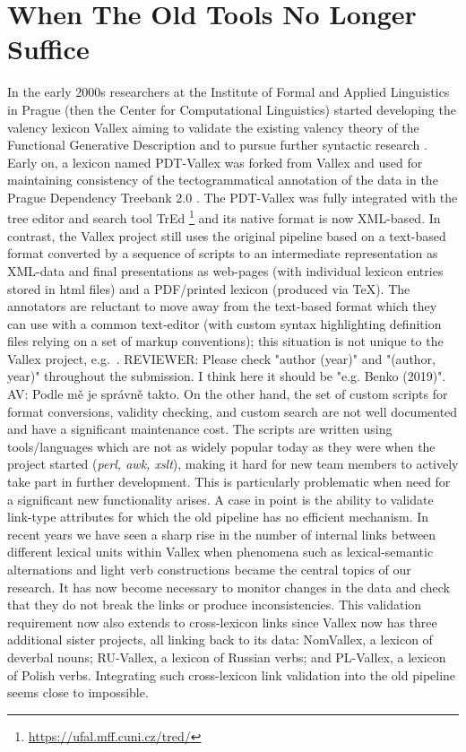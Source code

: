 \documentclass[10pt, a4paper]{article}
\newcommand{\av}[1]{{\color{ansa} AV: #1}}
\newcommand{\rrr}[1]{{\color{red} REVIEWER: #1}}
\begin{document}
\section{When The Old Tools No Longer Suffice}\label{sec:history}
In the early 2000s researchers at the Institute of Formal and Applied Linguistics in Prague
(then the Center for Computational Linguistics) started developing the valency lexicon Vallex aiming to
validate the existing valency theory of the Functional Generative Description \cite{Panevova74verbal,Panevova75verbal,Panevova80formy,PanevovaSkoumalova92surface} and to pursue
further syntactic research \cite{LopatkovaEtAl02tektogramaticky}.
Early on, a lexicon named PDT-Vallex was forked from Vallex and used for
maintaining consistency of the tectogrammatical annotation of the data in the
Prague Dependency Treebank 2.0 \cite{PDT2.0,HajicHonetschlager03annotation}.
The PDT-Vallex was fully integrated with the tree editor and search tool TrEd%
\footnote{\url{https://ufal.mff.cuni.cz/tred/}}
\cite{PajasStepanek08recent}
and its native format is now XML-based.
In contrast, 
the Vallex project still uses the original pipeline based on a text-based format
converted by a sequence of scripts to an intermediate representation as XML-data
\cite{Zabokrtsky05valency}
and final presentations as web-pages (with individual lexicon entries stored in html files)
and a PDF/printed lexicon (produced via TeX).
The annotators are reluctant to move away from the text-based format which they can use with a common text-editor
(with custom syntax highlighting definition files relying on a set of markup conventions);
this situation is not unique to the Vallex project, e.g.\ \cite{Benko19LexiCorp}.
\rrr{Please check "author (year)" and "(author, year)" throughout the submission. I think here it should be "e.g. Benko (2019)".}
\av{Podle mě je správně takto.}
On the other hand, the set of custom scripts for format conversions,
validity checking, and custom search are not well documented and have a significant
maintenance cost.
The scripts are written using tools/languages which are not as widely
popular today as they were when the project started (\emph{perl, awk, xslt}),
making it hard for new team members to actively take part in further development.
This is particularly problematic when need for a significant new functionality arises. A case in point
is the ability to validate link-type attributes for which the old pipeline has no efficient mechanism.
In recent years we have seen a sharp rise in the number of internal links between different lexical units within Vallex  when phenomena such as lexical-semantic alternations and light verb constructions became the central topics of our research. It has now become necessary to monitor changes in the data and check that they do not break the links or produce inconsistencies. This validation requirement now also extends to cross-lexicon links
since Vallex now has three additional sister projects, all linking back to its data: NomVallex, a lexicon of deverbal nouns; RU-Vallex, a lexicon of Russian verbs; and PL-Vallex, a lexicon of Polish verbs. Integrating such
cross-lexicon link validation into the old pipeline seems close to impossible.
\end{document}
